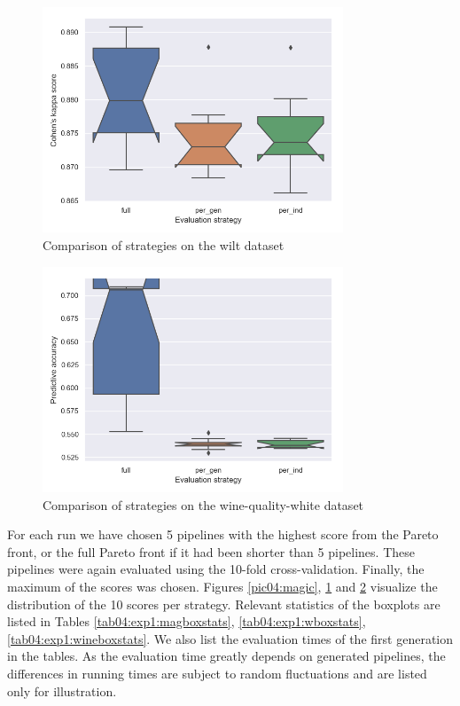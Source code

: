 \begin{figure}[pt]\centering
\includegraphics[width=0.8\textwidth]{../img/wilt-out.png}
\caption{Comparison of strategies on the wilt dataset}
\label{pic04:wilt}
\end{figure}

\begin{figure}[pt]\centering
\includegraphics[width=0.8\textwidth]{../img/winequality-out.png}
\caption{Comparison of strategies on the wine-quality-white dataset}
\label{pic04:winequality}
\end{figure}

For each run we have chosen 5 pipelines with the highest score
from the Pareto front, or the full Pareto front if it had been shorter than 5
pipelines. These pipelines were again evaluated using the 10-fold
cross-validation. Finally, the maximum of the scores was chosen. Figures
\ref{pic04:magic}, \ref{pic04:wilt} and \ref{pic04:winequality} visualize the
distribution of the 10 scores per strategy. Relevant statistics of the
boxplots are listed in Tables \ref{tab04:exp1:magboxstats},
\ref{tab04:exp1:wboxstats}, \ref{tab04:exp1:wineboxstats}.
We also list the evaluation times of the first generation in the tables. As the
evaluation time greatly depends on generated pipelines, the differences in running
times are subject to random fluctuations and are listed only for illustration.


